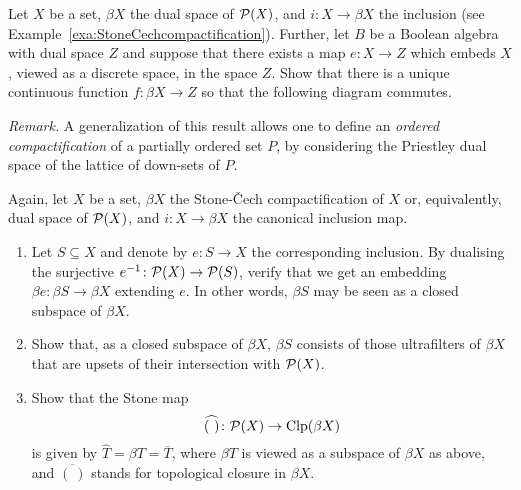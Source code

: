   
  \begin{exercise}\label{exe:StoneCech} Let $X$ be a set, $\beta X$ the dual space of $\mathcal{P}(X)$, and $i\colon X\to\beta X$ the inclusion (see Example~\ref{exa:StoneCechcompactification}). Further, let $B$ be a Boolean algebra with dual space $Z$ and suppose that there exists a map $e\colon X\to Z$ which embeds $X$, viewed as a discrete space, in the space $Z$. Show that there is a unique continuous function $f\colon\beta X\to Z$ so that the following diagram commutes.
   \begin{center}
      \end{center}
{\it Remark.} A generalization of this result allows one to define an \emph{ordered compactification} of a partially ordered set $P$, by considering the Priestley dual space of the lattice of down-sets of $P$.
  \end{exercise}

 \begin{exercise}\label{exe:beta-Stonemap}
  Again, let $X$ be a set, $\beta X$ the Stone-\v Cech compactification of $X$ or, equivalently, dual space of $\mathcal{P}(X)$, and $i\colon X\to\beta X$ the canonical  inclusion map. 
\begin{enumerate}
\item Let $S\subseteq X$ and denote by $e\colon S\to X$ the corresponding inclusion. By dualising the surjective $e^{-1}\colon\mathcal{P}(X)\to \mathcal{P}(S)$, verify that we get an embedding $\beta e\colon\beta S\to \beta X$ extending $e$. In other words, $\beta S$ may be seen as a closed subspace of $\beta X$.
\item Show that, as a closed subspace of $\beta X$, $\beta S$ consists of those ultrafilters of $\beta X$ that are upsets of their intersection with $\mathcal{P}(X)$.
\item Show that the Stone map 
\[
\widehat{(\ )}\colon\Po(X)\to \Clp(\beta X)
\] 
is given by $\widehat{T}=\beta T=\overline{T}$, where $\beta T$ is viewed as a subspace of $\beta X$ as above, and $\overline{(\ )}$ stands for topological closure in $\beta X$. 
\end{enumerate}
 \end{exercise}


\theendnotes
\setcounter{endnote}{0}



